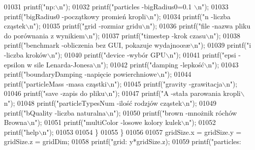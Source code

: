 \begin{DoxyCode}
{{{{{{{{{{01031             printf(\textcolor{stringliteral}{"np:\(\backslash\)n"});
01032             printf(\textcolor{stringliteral}{"particles -bigRadius0=0.1 \(\backslash\)n"});
01033             printf(\textcolor{stringliteral}{"bigRadius0 -początkowy promień kropli\(\backslash\)n"});
01034             printf(\textcolor{stringliteral}{"n -liczba cząstek\(\backslash\)n"});
01035             printf(\textcolor{stringliteral}{"grid -rozmiar gridu\(\backslash\)n"});
01036             printf(\textcolor{stringliteral}{"file -nazwa pliku do porównania z wynikiem\(\backslash\)n"});
01037             printf(\textcolor{stringliteral}{"timestep -krok czasu\(\backslash\)n"});
01038             printf(\textcolor{stringliteral}{"benchmark -obliczenia bez GUI, pokazuje wydajnoœæ\(\backslash\)n"});
01039             printf(\textcolor{stringliteral}{"i -liczba kroków\(\backslash\)n"});
01040             printf(\textcolor{stringliteral}{"device -wybór GPU\(\backslash\)n"});
01041             printf(\textcolor{stringliteral}{"epsi -epsilon w sile Lenarda-Jonesa\(\backslash\)n"});
01042             printf(\textcolor{stringliteral}{"damping -lepkość\(\backslash\)n"});
01043             printf(\textcolor{stringliteral}{"boundaryDamping -napięcie powierchniowe\(\backslash\)n"});
01044             printf(\textcolor{stringliteral}{"particleMass -masa cząstki\(\backslash\)n"});
01045             printf(\textcolor{stringliteral}{"gravity -grawitacja\(\backslash\)n"});
01046                         printf(\textcolor{stringliteral}{"save -zapis do pliku\(\backslash\)n"});
01047                         printf(\textcolor{stringliteral}{"A -stała parowania kropli\(\backslash\)n"});
01048                         printf(\textcolor{stringliteral}{"particleTypesNum -ilość rodzjów cząstek\(\backslash\)n"});
01049                         printf(\textcolor{stringliteral}{"bQuality -liczba naturalna\(\backslash\)n"});
01050                         printf(\textcolor{stringliteral}{"brown -mnożnik róchów Browna\(\backslash\)n"});
01051                         printf(\textcolor{stringliteral}{"multiColor -losowe kolory kulek\(\backslash\)n"});
01052             printf(\textcolor{stringliteral}{"help\(\backslash\)n"});
01053 
01054         \}
01055     \}
01056 
01057     gridSize.x = gridSize.y = gridSize.z = gridDim;
01058     printf(\textcolor{stringliteral}{"grid: %
      y*gridSize.z);
01059     printf(\textcolor{stringliteral}{"particles: %
}}}}}}}}}}}}
\end{DoxyCode}
